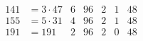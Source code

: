 \documentclass{amsart}
\numberwithin{equation}{section}
\theoremstyle{definition}
\begin{document}
\begin{table}[ht]
\[\begin{array}{|rl|c|r|r|c|r|}
		141&= 3 \cdot 47 & 6 & 96 & 2 & 1 & 48 \\
		155&= 5 \cdot 31 & 4 & 96 & 2 & 1 & 48 \\
		191&= 191 & 2 & 96 & 2 & 0 & 48 \\

\end{array}\]
\end{table}
\end{document}
